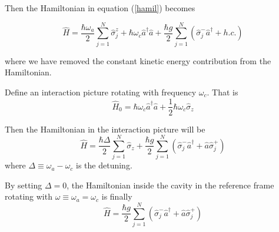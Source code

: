 \documentclass{article}
\newcommand{\omegaa}{\omega_a}
\newcommand{\omegac}{\omega_c}
\begin{document}
Then the Hamiltonian in equation (\ref{hamil}) becomes

\begin{equation}
\label{hamil_vanilla}
\hat{H}=\frac{\hbar \omegaa}{2}\sum^{N}_{j=1}\hat{\sigma}^z_j+\hbar \omegac \hat{a}^{\dagger}\hat{a}+\frac{\hbar g}{2}\sum^{N}_{j=1}\left( \hat{\sigma}^-_j\hat{a}^\dagger+h.c.\right)
\end{equation}

where we have removed the constant kinetic energy contribution from the Hamiltonian.

Define an interaction picture rotating with frequency $\omegac$. That is
\begin{equation}
\hat{H}_0=\hbar \omegac \hat{a}^\dagger\hat{a}+\frac{1}{2}\hbar \omegac \hat{\sigma}_z
\end{equation}

Then the Hamiltonian in the interaction picture will be
\begin{equation}
\label{hamil_vanilla_IP}
\hat{H}=\frac{\hbar\Delta}{2}\sum_{j=1}^{N}\hat{\sigma}_z+\frac{\hbar g}{2}\sum_{j=1}^{N}\left( \hat{\sigma}^-_j\hat{a}^\dagger+\hat{a}\hat{\sigma}^+_j\right)
\end{equation}
where $\Delta\equiv\omegaa-\omegac$ is the detuning.

By setting $\Delta=0$, the Hamiltonian inside the cavity in the reference frame rotating with $\omega\equiv\omegaa=\omegac$ is finally
\begin{equation}
\label{hamilfinal}
\hat{H}=\frac{\hbar g}{2}\sum_{j=1}^{N}\left( \hat{\sigma}^-_j\hat{a}^\dagger+\hat{a}\hat{\sigma}^+_j\right)
\end{equation}
\end{document}
